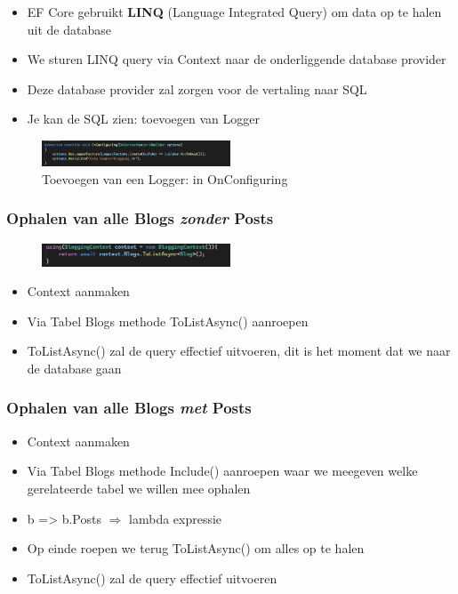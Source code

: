 \documentclass{article}
\begin{document}
\begin{itemize}
    \item EF Core gebruikt \textbf{LINQ} (Language Integrated Query) om data op te halen uit de database
    \item We sturen LINQ query via Context naar de onderliggende database provider
    \item Deze database provider zal zorgen voor de vertaling naar SQL
    \item Je kan de SQL zien: toevoegen van Logger
\end{itemize}

\begin{figure}[H]
    \centering
    \includegraphics[width=0.5\textwidth]{efcore-querying-logger.png}
    \caption{Toevoegen van een Logger: in OnConfiguring}
\end{figure}

\subsubsection{Ophalen van alle Blogs \textit{zonder} Posts}

\begin{figure}[H]
    \centering
    \includegraphics[width=0.5\textwidth]{querying-select-zonder.png}
    \caption{}
\end{figure}


\begin{itemize}
    \item Context aanmaken
    \item Via Tabel Blogs methode ToListAsync() aanroepen
    \item ToListAsync() zal de query effectief uitvoeren, dit is het moment dat we naar de database gaan
\end{itemize}

\subsubsection{Ophalen van alle Blogs \textit{met} Posts}

\begin{itemize}
    \item Context aanmaken
    \item Via Tabel Blogs methode Include() aanroepen waar we meegeven welke gerelateerde tabel we willen mee ophalen
    \item b => b.Posts $\Rightarrow$ lambda expressie
    \item Op einde roepen we terug ToListAsync() om alles op te halen
    \item ToListAsync() zal de query effectief uitvoeren
\end{itemize}
\end{document}
